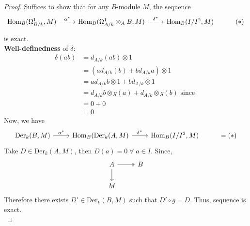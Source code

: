 \documentclass[oneside, 12pt, ]{scrbook}
\newcommand{\Hom}{\mathrm{Hom}}
\theoremstyle{theorem}
\begin{document}
\begin{proof}
Suffices to show that for any $B$-module $M$, the sequence 
\[\begin{tikzcd}
	{\Hom_{B}(\Omega_{B/k}^{1},M)} & {\Hom_{B}(\Omega_{A/k}^{1} \otimes_{A} B,M)} & {\Hom_{B}(I/I^2,M)} & {(*)}
	\arrow["\delta^*", from=1-2, to=1-3]
	\arrow["\alpha^*", from=1-1, to=1-2]
\end{tikzcd}\] is exact. \\
\textbf{Well-definedness} of $\delta$: 
\begin{align*}
\delta(ab) &= d_{A/k}(ab) \otimes 1 \\
&=(ad_{A/k}(b) + bd_{A/k}a) \otimes 1 \\
&= ad_{A/k}b \otimes 1 + bd_{A/k} \otimes 1 \\
&= d_{A/k}b \otimes g(a) + d_{A/k} \otimes g(b) \text{ since }\\
&= 0+0 \\
&= 0
\end{align*}
Now, we have 
\[\begin{tikzcd}
	{\mathrm{Der}_{k}(B,M)} & {\Hom_{B}( \mathrm{Der}_{k}(A,M)} & {\Hom_{B}(I/I^2,M)} & {=(*)}
	\arrow["\delta^*", from=1-2, to=1-3]
	\arrow["\alpha^*", from=1-1, to=1-2]
\end{tikzcd}\]
Take $D\in \mathrm{Der}_{k}(A,M)$, then $D(a)=0 \; \forall \; a \in I$. Since, 
\[\begin{tikzcd}
	A & B \\
	M
	\arrow[two heads, from=1-1, to=1-2]
	\arrow[from=1-1, to=2-1]
\end{tikzcd}\]
Therefore there exists $D' \in \mathrm{Der}_{k}(B,M)$ such that $D' \circ g = D$. Thus, sequence is exact. \\


\end{proof}
\end{document}
